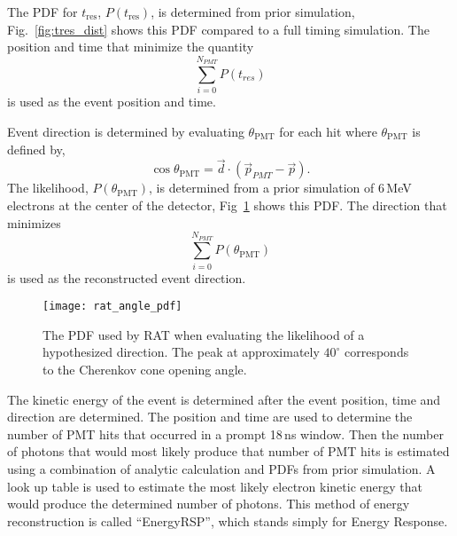 The PDF for $t_{\mathrm{res}}$, $P(t_{\mathrm{res}})$, is determined from prior simulation,
Fig.~\ref{fig:tres_dist} shows this PDF compared to a full timing simulation.
The position and time that minimize the quantity
\begin{equation}
\sum_{i=0}^{N_{PMT}} P(t_{res}) %
\end{equation}
is used as the event position and time.

Event direction is determined by evaluating $\theta_{\mathrm{PMT}}$ for each hit where
$\theta_{\mathrm{PMT}}$ is defined by,
\begin{equation}
    \cos\theta_{\mathrm{PMT}} = \vec{d}\cdot\left(\vec{p}_{PMT} - \vec{p}\right)\text{.}
\end{equation}
The likelihood, $P(\theta_{\mathrm{PMT}})$, is determined from a prior simulation of
6\,MeV electrons at the center of the detector, Fig~\ref{fig:rat_angle_pdf} shows
this PDF\@. %
The direction that minimizes
\begin{equation}
\sum_{i=0}^{N_{PMT}} P(\theta_{\mathrm{PMT}})
\end{equation}
is used as the reconstructed event direction.

\begin{figure}[htbp]
\centering
\texttt{[image: rat\_angle\_pdf]}
\caption[RAT PDF for Direction Fit]{The PDF used by RAT when evaluating the
likelihood of a hypothesized direction.  The peak at approximately $40^{\circ}$
corresponds to the Cherenkov cone opening angle.}
\label{fig:rat_angle_pdf}
\end{figure}

The kinetic energy of the event is determined after
the event position, time and direction are determined.
The position and time are used to determine the number of PMT
hits that occurred in a prompt 18\,ns window.
Then the number of photons that would most likely produce
that number of PMT hits is estimated using a combination of
analytic calculation and PDFs from prior simulation.
A look up table is used to estimate the most likely electron
kinetic energy that would produce the determined number of photons.
This method of energy reconstruction is called ``EnergyRSP'', which stands
simply for Energy Response.

